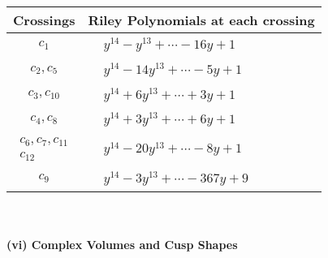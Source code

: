 \documentclass[1p]{elsarticle_modified}
\theoremstyle{definition}
\begin{document}
\begin{tabular}{m{50pt}|m{274pt}}
Crossings & \hspace{64pt}Riley Polynomials at each crossing \\
\hline $$\begin{aligned}c_{1}\end{aligned}$$&$\begin{aligned}
&y^{14}- y^{13}+\cdots-16 y+1
\end{aligned}$\\
\hline $$\begin{aligned}c_{2},c_{5}\end{aligned}$$&$\begin{aligned}
&y^{14}-14 y^{13}+\cdots-5 y+1
\end{aligned}$\\
\hline $$\begin{aligned}c_{3},c_{10}\end{aligned}$$&$\begin{aligned}
&y^{14}+6 y^{13}+\cdots+3 y+1
\end{aligned}$\\
\hline $$\begin{aligned}c_{4},c_{8}\end{aligned}$$&$\begin{aligned}
&y^{14}+3 y^{13}+\cdots+6 y+1
\end{aligned}$\\
\hline $$\begin{aligned}c_{6},c_{7},c_{11}\\c_{12}\end{aligned}$$&$\begin{aligned}
&y^{14}-20 y^{13}+\cdots-8 y+1
\end{aligned}$\\
\hline $$\begin{aligned}c_{9}\end{aligned}$$&$\begin{aligned}
&y^{14}-3 y^{13}+\cdots-367 y+9
\end{aligned}$\\
\hline
\end{tabular}\\~\\
\newpage\flushleft \textbf{(vi) Complex Volumes and Cusp Shapes}
\end{document}
